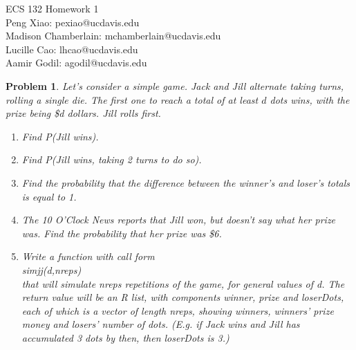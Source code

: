 \documentclass[10pt]{article}
\newtheorem{prob}{Problem}
\begin{document}
\noindent ECS 132 Homework 1 \\
Peng Xiao: pexiao@ucdavis.edu \\
Madison Chamberlain: mchamberlain@ucdavis.edu \\
Lucille Cao: lhcao@ucdavis.edu\\
Aamir Godil: agodil@ucdavis.edu 

\hrulefill 
\begin{prob}
Let's consider a simple game. Jack and Jill alternate taking turns, rolling a single die. The first one to reach a total of at least $d$ dots wins, with the prize being \$d dollars. Jill rolls first.
\begin{enumerate}
    \item Find P(Jill wins).
    \item Find P(Jill wins, taking 2 turns to do so).
    \item Find the probability that the difference between the winner's and loser's totals is equal to 1.
    \item The 10 O'Clock News reports that Jill won, but doesn't say what her prize was. Find the probability that her prize was \$6.
    \item Write a function with call form \\ 
    simjj(d,nreps) \\ 
    that will simulate nreps repetitions of the game, for general values of d. The return value will be an R list, with components winner, prize and loserDots, each of which is a vector of length nreps, showing winners, winners' prize money and losers' number of dots. (E.g. if Jack wins and Jill has accumulated 3 dots by then, then loserDots is 3.)
\end{enumerate}
\end{prob}
\end{document}
